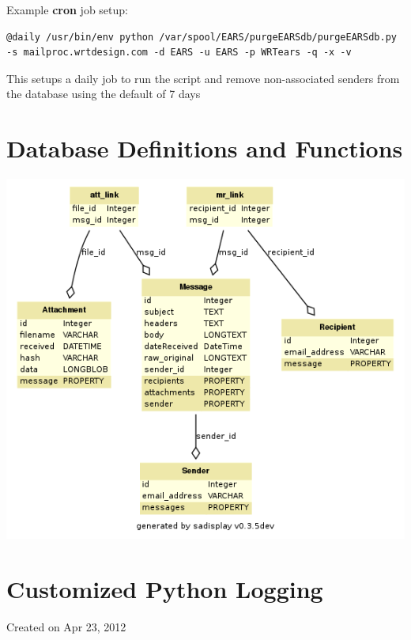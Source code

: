 \documentclass[letterpaper,10pt,english]{sphinxmanual}
\begin{document}
Example \textbf{cron} job setup:

\begin{Verbatim}[commandchars=\\\{\},formatcom=\footnotesize]
@daily /usr/bin/env python /var/spool/EARS/purgeEARSdb/purgeEARSdb.py -s mailproc.wrtdesign.com -d EARS -u EARS -p WRTears -q -x -v
\end{Verbatim}

This setups a daily job to run the script and remove non-associated senders from the database using the default of 7 days


\section{Database Definitions and Functions}
\label{codedocs/database:database-definitions-and-functions}\label{codedocs/database::doc}\label{codedocs/database:sqlalchemy}\label{codedocs/database:module-database.SQLAlchemy}\label{codedocs/database:sqlalchemy}\includegraphics{sadisplay-6eaf309bd450fd536a3de386f2bd1c402f775f00.png}\label{codedocs/database:module-database.toDB}

\section{Customized Python Logging}
\label{codedocs/logs:customized-python-logging}\label{codedocs/logs::doc}\label{codedocs/logs:module-logs}\label{codedocs/logs:module-logs.logger}
Created on Apr 23, 2012
\end{document}
